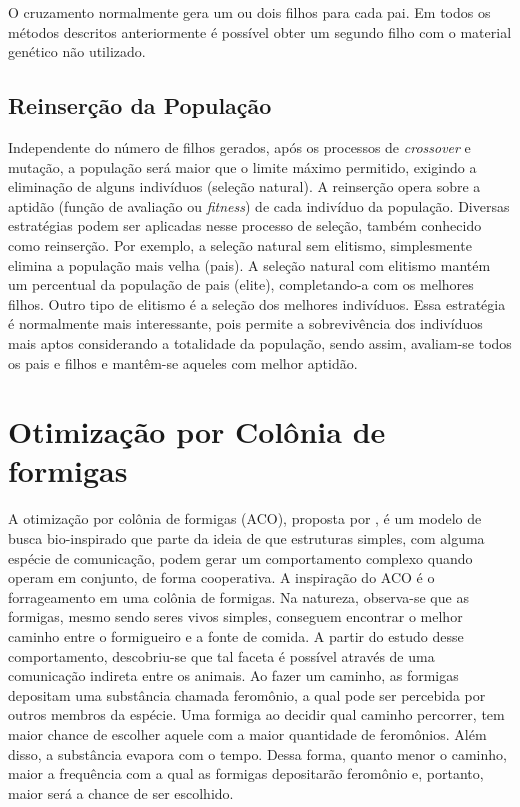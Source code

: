 O cruzamento normalmente gera um ou dois filhos para cada pai. Em todos os métodos descritos anteriormente é possível obter um segundo filho com o material genético não utilizado.

\subsection{Reinserção da População}
Independente do número de filhos gerados, após os processos de \textit{crossover} e mutação, a população será maior que o limite máximo permitido, exigindo a eliminação de alguns indivíduos (seleção natural). A reinserção opera sobre a aptidão (função de avaliação ou \textit{fitness}) de cada indivíduo da população. Diversas estratégias podem ser aplicadas nesse processo de seleção, também conhecido como reinserção. Por exemplo, a seleção natural sem elitismo, simplesmente elimina a população mais velha (pais). A seleção natural com elitismo mantém um percentual da população de pais (elite), completando-a com os melhores filhos. Outro tipo de elitismo é a seleção dos melhores indivíduos. Essa estratégia é normalmente mais interessante, pois permite a sobrevivência dos indivíduos mais aptos considerando a totalidade da população, sendo assim, avaliam-se todos os pais e filhos e mantêm-se aqueles com melhor aptidão.

\section{Otimização por Colônia de formigas}
\label{section_aco}
A otimização por colônia de formigas (ACO), proposta por , é um modelo de busca bio-inspirado que parte da ideia de que estruturas simples, com alguma espécie de comunicação, podem gerar um comportamento complexo quando operam em conjunto, de forma cooperativa. A inspiração do ACO é o forrageamento em uma colônia de formigas. Na natureza, observa-se que as formigas, mesmo sendo seres vivos simples, conseguem encontrar o melhor caminho entre o formigueiro e a fonte de comida. A partir do estudo desse comportamento, descobriu-se que tal faceta é possível através de uma comunicação indireta entre os animais. Ao fazer um caminho, as formigas depositam uma substância chamada feromônio, a qual pode ser percebida por outros membros da espécie. Uma formiga ao decidir qual caminho percorrer, tem maior chance de escolher aquele com a maior quantidade de feromônios. Além disso, a substância evapora com o tempo. Dessa forma, quanto menor o caminho, maior a frequência com a qual as formigas depositarão feromônio e, portanto, maior será a chance de ser escolhido.

